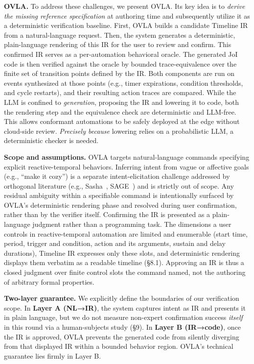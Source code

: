 \documentclass[sigconf,nonacm,anonymous,review]{acmart}
\begin{document}
\textbf{OVLA.} To address these challenges, we present OVLA. Its key idea is to \emph{derive the missing reference specification} at authoring time and subsequently utilize it as a deterministic verification baseline.
First, OVLA builds a candidate Timeline IR from a natural-language request. Then, the system generates a deterministic, plain-language rendering of this IR for the user to review and confirm.
This confirmed IR serves as a per-automation behavioral oracle. The generated JoI code is then verified against the oracle by bounded trace-equivalence over the finite set of transition points defined by the IR. Both components are run on events synthesized at those points (e.g., timer expirations, condition thresholds, and cycle restarts), and their resulting action traces are compared. While the LLM is confined to \emph{generation}, proposing the IR and lowering it to code, both the rendering step and the equivalence check are deterministic and LLM-free. This allows conformant automations to be safely deployed at the edge without cloud-side review. \emph{Precisely because} lowering relies on a probabilistic LLM,
a deterministic checker is needed.

\textbf{Scope and assumptions.} 
OVLA targets natural-language commands specifying explicit reactive-temporal behaviors. Inferring intent from vague or affective goals (e.g., ``make it cozy'') is a separate intent-elicitation challenge addressed by orthogonal literature (e.g., Sasha~\cite{sasha}, SAGE~\cite{sage}) and is strictly out of scope. Any residual ambiguity within a specifiable command is intentionally surfaced by OVLA's deterministic rendering phase and resolved during user confirmation, rather than by the verifier itself. 
Confirming the IR is presented as a plain-language judgment rather than a programming task. The dimensions a user controls in reactive-temporal automation are limited and enumerable (start time, period, trigger and condition, action and its arguments, sustain and delay durations), Timeline IR expresses only these slots, and deterministic rendering displays them verbatim as a readable timeline (\S8.1). Approving an IR is thus a closed judgment over finite control slots the command named, not the authoring of arbitrary formal properties.

\textbf{Two-layer guarantee.} We explicitly define the boundaries of our verification scope.
In \textbf{Layer A (NL→IR)}, the system captures intent as IR and presents it in plain language, but we do not measure non-expert confirmation success \emph{itself} in this round via a human-subjects study (\S9). In \textbf{Layer B (IR→code)}, once the IR is approved, OVLA prevents the generated code from silently diverging from that displayed IR within a bounded behavior region. OVLA's technical guarantee lies firmly in Layer B.
\end{document}

